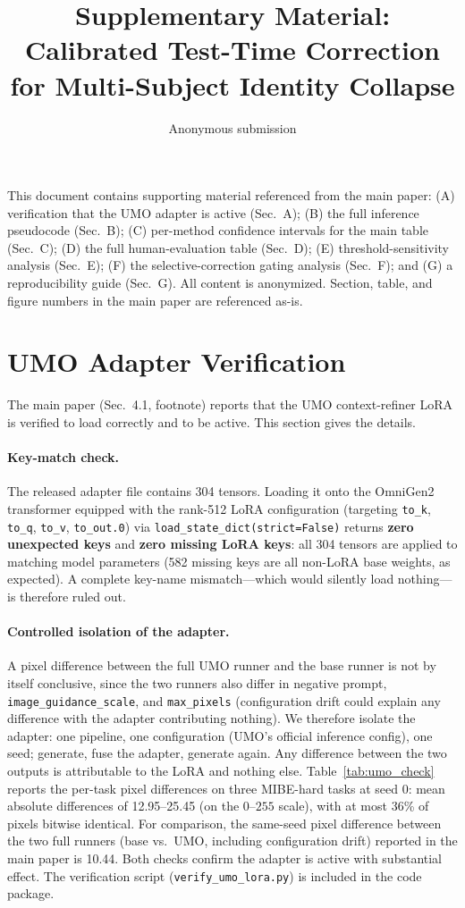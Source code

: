 \documentclass[letterpaper]{article}
\title{Supplementary Material:\\Calibrated Test-Time Correction for Multi-Subject Identity Collapse}
\author{
    Anonymous submission
}
\begin{document}
\maketitle

This document contains supporting material referenced from the main paper: (A) verification that the UMO adapter is active (Sec.~A); (B) the full inference pseudocode (Sec.~B); (C) per-method confidence intervals for the main table (Sec.~C); (D) the full human-evaluation table (Sec.~D); (E) threshold-sensitivity analysis (Sec.~E); (F) the selective-correction gating analysis (Sec.~F); and (G) a reproducibility guide (Sec.~G). All content is anonymized. Section, table, and figure numbers in the main paper are referenced as-is.

\section{UMO Adapter Verification}
\label{sec:umo_verify}

The main paper (Sec.~4.1, footnote) reports that the UMO context-refiner LoRA is verified to load correctly and to be active. This section gives the details.

\paragraph{Key-match check.} The released adapter file contains 304 tensors. Loading it onto the OmniGen2 transformer equipped with the rank-512 LoRA configuration (targeting \texttt{to\_k}, \texttt{to\_q}, \texttt{to\_v}, \texttt{to\_out.0}) via \texttt{load\_state\_dict(strict=False)} returns \textbf{zero unexpected keys} and \textbf{zero missing LoRA keys}: all 304 tensors are applied to matching model parameters (582 missing keys are all non-LoRA base weights, as expected). A complete key-name mismatch---which would silently load nothing---is therefore ruled out.

\paragraph{Controlled isolation of the adapter.} A pixel difference between the full UMO runner and the base runner is not by itself conclusive, since the two runners also differ in negative prompt, \texttt{image\_guidance\_scale}, and \texttt{max\_pixels} (configuration drift could explain any difference with the adapter contributing nothing). We therefore isolate the adapter: one pipeline, one configuration (UMO's official inference config), one seed; generate, fuse the adapter, generate again. Any difference between the two outputs is attributable to the LoRA and nothing else. Table~\ref{tab:umo_check} reports the per-task pixel differences on three MIBE-hard tasks at seed 0: mean absolute differences of 12.95--25.45 (on the $0$--$255$ scale), with at most 36\% of pixels bitwise identical. For comparison, the same-seed pixel difference between the two full runners (base vs.\ UMO, including configuration drift) reported in the main paper is 10.44. Both checks confirm the adapter is active with substantial effect. The verification script (\texttt{verify\_umo\_lora.py}) is included in the code package.
\end{document}

